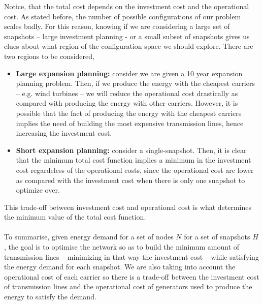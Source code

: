 Notice, that the total cost depends on the investment cost and the operational cost. As stated before, the number of possible configurations of our problem scales badly. For this reason, knowing if we are considering a large set of snapshots -- large investment planning - or a small subset of snapshots gives us clues about what region of the configuration space we should explore. There are two regions to be considered,
\begin{itemize}
    \item \textbf{Large expansion planning:} consider we are given a 10 year expansion planning problem. Then, if we produce the energy with the  cheapest carriers -- e.g. wind turbines -- we will reduce the operational cost drastically as compared with producing the energy with other carriers. However, it is possible that the fact of producing the energy with the cheapest carriers implies the need of building the most expensive transmission lines, hence increasing the investment cost.
    \item \textbf{Short expansion planning:} consider a single-snapshot.  Then, it is clear that the minimum total cost function implies a minimum in the investment cost regardeless of the operational costs, since the operational cost are lower as compared with the investment cost when there is only one snapshot to optimize over.
\end{itemize}
This trade-off between investment cost and operational cost is what determines the minimum value of the total cost function.\\\\
To summarise, given energy demand for a set of nodes $N$ for a set of snapshots $H$, the goal is to optimise the network so as to build the minimum amount of transmission lines -- minimizing in that way the investment cost -- while satisfying the energy demand for each snapshot. We are also taking into account the operational cost of each carrier so there is a trade-off between the investment cost of transmission lines and the operational cost of generators used to produce the energy to satisfy the demand.
